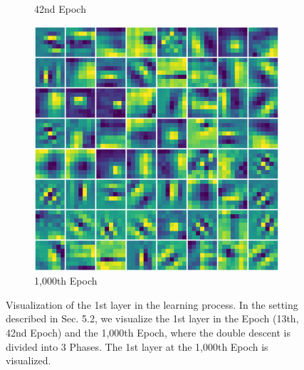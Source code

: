 \begin{figure}[h]
\begin{subfigure}{0.3\textwidth}
        \caption{42nd Epoch}
        \label{fig:42nd}
    \end{subfigure}
    \begin{subfigure}{0.3\textwidth}
        \centering
        \includegraphics[width=\linewidth]{fig/IN_kernel/Visualize_epoch1000.pdf}
        \caption{1,000th Epoch}
        \label{fig:1000th}
    \end{subfigure}
    \caption[Visualization of the 1st layer in the learning process.]{
    Visualization of the 1st layer in the learning process. In the setting described in Sec. 5.2, we visualize the 1st layer in the Epoch (13th, 42nd Epoch) and the 1,000th Epoch, where the double descent is divided into 3 Phases. The 1st layer at the 1,000th Epoch is visualized.
    }
    \label{fig:visualized_kernel}
\end{figure}

\newpage

